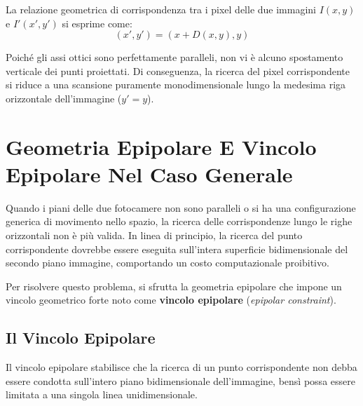 ﻿\documentclass[11pt, a4paper]{article}
\begin{document}
La relazione geometrica di corrispondenza tra i pixel delle due immagini $I(x,y)$ e $I'(x', y')$ si esprime come:
\begin{equation}
(x', y') = (x + D(x, y), y)
\end{equation}

Poiché gli assi ottici sono perfettamente paralleli, non vi è alcuno spostamento verticale dei punti proiettati. Di conseguenza, la ricerca del pixel corrispondente si riduce a una scansione puramente monodimensionale lungo la medesima riga orizzontale dell'immagine ($y' = y$).

\newpage

\section{Geometria Epipolare E Vincolo Epipolare Nel Caso Generale}

Quando i piani delle due fotocamere non sono paralleli o si ha una configurazione generica di movimento nello spazio, la ricerca delle corrispondenze lungo le righe orizzontali non è più valida. In linea di principio, la ricerca del punto corrispondente dovrebbe essere eseguita sull'intera superficie bidimensionale del secondo piano immagine, comportando un costo computazionale proibitivo.


Per risolvere questo problema, si sfrutta la geometria epipolare che impone un vincolo geometrico forte noto come \textbf{vincolo epipolare} (\emph{epipolar constraint}).



\subsection{Il Vincolo Epipolare}

Il vincolo epipolare stabilisce che la ricerca di un punto corrispondente non debba essere condotta sull'intero piano bidimensionale dell'immagine, bensì possa essere limitata a una singola linea unidimensionale.

\end{document}
